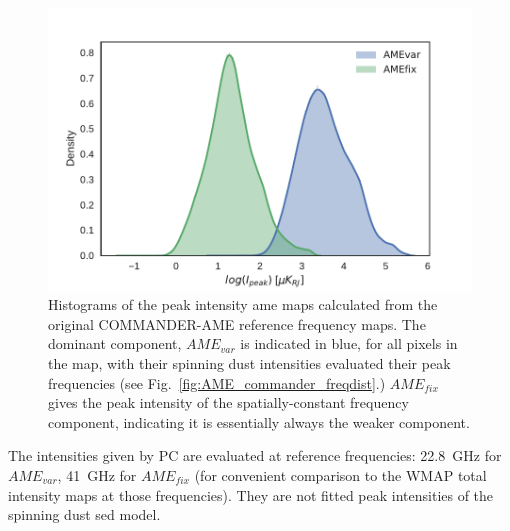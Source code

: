               \begin{figure}
                 \includegraphics[width=\textwidth]{../Plots/ch_datasources/AME_comps_distplot.pdf}
                 \centering
                 \caption{Histograms of the peak intensity \acrshort{ame} maps calculated from the original COMMANDER-AME reference frequency maps. The dominant component, $AME_{var}$ is indicated in blue, for all pixels in the map, with their spinning dust intensities evaluated their peak frequencies (see Fig.~\ref{fig:AME_commander_freqdist}.) $AME_{fix}$ gives the peak intensity of the spatially-constant frequency component, indicating it is essentially always the weaker component.}
                 \label{fig:AME_comps_distplot}
              \end{figure}
           The intensities given by PC are evaluated at reference frequencies: 22.8~GHz for $AME_{var}$, 41~GHz for $AME_{fix}$ (for convenient comparison to the WMAP total intensity maps at those frequencies). They are not fitted peak intensities of the spinning dust \acrshort{sed} model.

